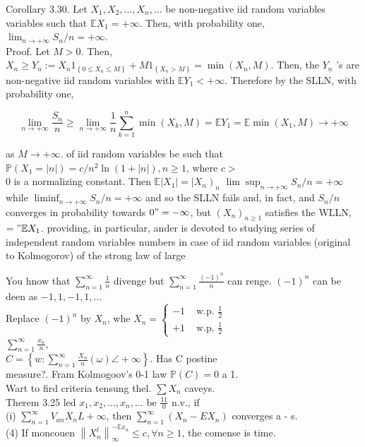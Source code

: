 \documentclass{amsbook}
\theoremstyle{plain}%
\theoremstyle{definition}
\theoremstyle{remark}
\begin{document}
    Corollary 3.30. Let $X_{1}, X_{2}, \ldots, X_{n}, \ldots$ be non-negative iid random variables variables such that $\mathbb{E} X_{1}=+\infty$. Then, with probability one, $\lim _{n \rightarrow+\infty} S_{n} / n=+\infty$.\\
    Proof. Let $M>0$. Then, $X_{n} \geq Y_{n}:=X_{n} 1_{\left\{0 \leq X_{n} \leq M\right\}}+M 1_{\left\{X_{n}>M\right\}}=\min \left(X_{n}, M\right)$. Then, the $Y_{n}$ 's are non-negative iid random variables with $\mathbb{E} Y_{1}<+\infty$. Therefore by the SLLN, with probability one,

    $$
    \lim _{n \rightarrow+\infty} \frac{S_{n}}{n} \geq \lim _{n \rightarrow+\infty} \frac{1}{n} \sum_{k=1}^{n} \min \left(X_{k}, M\right)=\mathbb{E} Y_{1}=\mathbb{E} \min \left(X_{1}, M\right) \longrightarrow+\infty
    $$

    as $M \rightarrow+\infty$. of iid random variables be such that $\mathbb{P}\left(X_{1}=|n|\right)=c / n^{2} \ln (1+|n|), n \geq 1$, where $c>$\\
  0 is a normalizing constant. Then $\left.\mathbb{E}\left|X_{1}\right|=\mid X_{n}\right)_{n}$ $\lim \sup _{n \rightarrow+\infty} S_{n} / n=+\infty$ while $\liminf _{n \rightarrow+\infty} S_{n} / n=+\infty$ and so the SLLN fails and, in fact, and $S_{n} / n$ converges in probability towards $0 "=-\infty$, but $\left(X_{n}\right)_{n \geq 1}$ satisfies the WLLN,\\
  $=" \mathbb{E} X_{1}$. providing, in particular, ander is devoted to studying series of independent random variables numbers in case of iid random variables (original to Kolmogorov) of the strong law of large

  You hnow that $\sum_{n=1}^{\infty} \frac{1}{n}$ divenge but $\sum_{n=1}^{\infty} \frac{(-1)^{n}}{n}$ can renge. $(-1)^{n}$ can be deen as $-1,1,-1,1, \ldots$\\
  Replace $(-1)^{n}$ by $X_{n}$, whe $X_{n}=
  \begin{cases}-1 & \text { w.p. } \frac{1}{2} \\ +1 & \text { w.p. } \frac{1}{2}
  \end{cases}$\\
  $\sum_{n=1}^{\infty} \frac{x_{n}}{n}$,\\
  $C=\left\{w: \sum_{n=1}^{\infty} \frac{X_{n}}{n}(\omega) \angle+\infty\right\}$. Has C postine\\
  measure?. Fram Kolmogoov's 0-1 law $\mathbb{P}(C)=0$ a 1.\\
  Wart to fird criteria tensung thel. $\sum X_{n}$ caveys.\\
  Therem 3.25 led $x_{1}, x_{2}, \ldots, x_{n}, \ldots$ be $\frac{11}{0}$ n.v., if\\
  (i) $\sum_{n=1}^{\infty} V_{a n} X_{n} L+\infty$, then $\sum_{n=1}^{\infty}\left(X_{n}-E X_{n}\right)$ converges a - s.\\
  (4) If moncouen $\left\|X_{n}^{l}\right\|_{\infty}^{-\mathbb{E} x_{n}} \leqslant c, \forall n \geqslant 1$, the comense is time.
\end{document}
